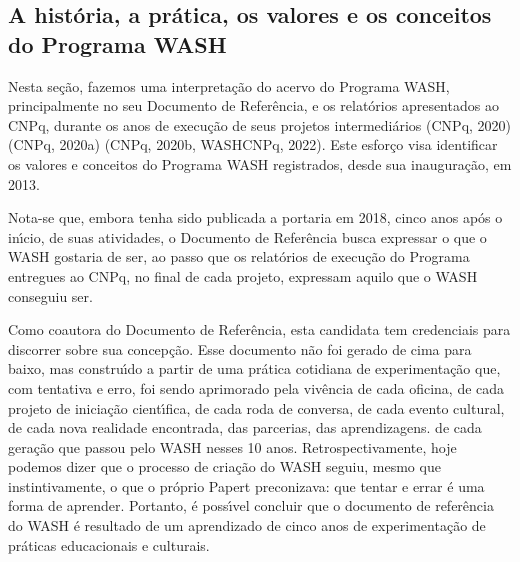 \documentclass[
12pt,		%
openright,	%
twoside,  %
a4paper,			%
chapter=TITLE,		%
english,			%
french,				%
spanish,			%
brazil				%
]{USPSC-classe/USPSC}
\begin{document}
\subsection[A hist\'oria, a pr\'atica, os valores e os conceitos do Programa WASH]{A hist\'oria, a pr\'atica, os valores e os conceitos do Programa WASH}\label{A hist\'oria, a pr\'atica, os valores e os conceitos do Programa WASH}
Nesta se\c{c}\~ao, fazemos uma interpreta\c{c}\~ao do acervo do Programa WASH, principalmente no seu Documento de Refer\^encia, e os relat\'orios apresentados ao CNPq, durante os anos de execu\c{c}\~ao de seus projetos intermedi\'arios (CNPq, 2020)  (CNPq, 2020a) (CNPq, 2020b, WASHCNPq, 2022). Este esfor\c{c}o visa identificar os valores e conceitos do Programa WASH registrados, desde sua inaugura\c{c}\~ao, em 2013.









Nota-se que, embora tenha sido publicada a portaria em 2018, cinco anos ap\'os o in\'{\i}cio, de suas atividades, o Documento de Refer\^encia busca expressar \textquotedbl o que o WASH gostaria de ser\textquotedbl , ao passo que os relat\'orios de execu\c{c}\~ao do Programa entregues ao CNPq, no final de cada projeto, expressam \textquotedbl aquilo que o WASH conseguiu ser\textquotedbl .









Como coautora do Documento de Refer\^encia, esta candidata tem credenciais para discorrer sobre sua concep\c{c}\~ao. Esse documento n\~ao foi gerado de cima para baixo, mas constru\'{\i}do a partir de uma pr\'atica cotidiana de experimenta\c{c}\~ao que, com  \textquotedbl tentativa e erro\textquotedbl , foi sendo aprimorado pela viv\^encia de cada oficina, de cada projeto de inicia\c{c}\~ao cient\'{\i}fica, de cada roda de conversa, de cada  evento cultural, de cada nova realidade encontrada, das parcerias, das aprendizagens. de cada gera\c{c}\~ao que passou pelo WASH nesses 10 anos. Retrospectivamente, hoje podemos dizer que o processo de cria\c{c}\~ao do WASH seguiu, mesmo que instintivamente, o que o pr\'oprio Papert preconizava: que tentar e errar \'e uma forma de aprender. Portanto, \'e poss\'{\i}vel concluir que o documento de refer\^encia do WASH \'e resultado de um aprendizado de cinco anos de experimenta\c{c}\~ao de pr\'aticas educacionais e culturais.
\end{document}
